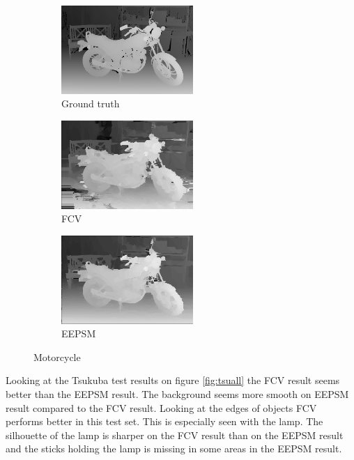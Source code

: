 \begin{figure}[ht]
  \centering
  \begin{subfigure}[t]{0.3\textwidth}
    \centering\includegraphics[width=5cm]{figures/mot_gt.png}
    \caption{Ground truth \cite{Scharstein2014}\label{fig:mot_gt}}
  \end{subfigure}\hspace{0.5cm}
  \begin{subfigure}[t]{0.3\textwidth}
    \centering\includegraphics[width=5cm]{figures/mot_fcv}
    \caption{FCV\label{fig:mot_fcv}}
  \end{subfigure}\hspace{0.5cm}
  \begin{subfigure}[t]{0.3\textwidth}
    \centering\includegraphics[width=5cm]{figures/mot_eepsm1}
    \caption{EEPSM\label{fig:mot_eepsm}}
  \end{subfigure}
  \caption{Motorcycle \cite{Scharstein2014}\label{fig:motall}}
\end{figure}

Looking at the Tsukuba test results on figure \vref{fig:tsuall} the FCV result seems better than the EEPSM result. The background seems more smooth on EEPSM result compared to the FCV result. Looking at the edges of objects FCV performs better in this test set. This is especially seen with the lamp. The silhouette of the lamp is sharper on the FCV result than on the EEPSM result and the sticks holding the lamp is missing in some areas in the EEPSM result.\\


